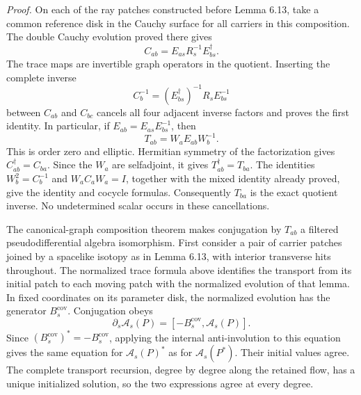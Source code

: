\documentclass[
  english,
  11pt,
  reqno]{amsart}
\begin{document}
\emph{Proof.} On each of the ray patches constructed before Lemma 6.13,
take a common reference disk in the Cauchy surface for all carriers in
this composition. The double Cauchy evolution proved there gives%
 \[
C_{ab}=E_{as}R_s^{-1}E_{bs}^\dagger.
\] The trace maps are invertible graph operators in the quotient.
Inserting the complete inverse \[
C_b^{-1}=(E_{bs}^\dagger)^{-1}R_sE_{bs}^{-1}
\] between \(C_{ab}\) and \(C_{bc}\) cancels all four adjacent inverse
factors and proves the first identity. In particular, if
\(E_{ab}=E_{as}E_{bs}^{-1}\), then%
 \[
T_{ab}=W_aE_{ab}W_b^{-1}.
\] This is order zero and elliptic. Hermitian symmetry of the
factorization gives \(C_{ab}^\dagger=C_{ba}\). Since the \(W_a\) are
selfadjoint, it gives \(T_{ab}^\dagger=T_{ba}\). The identities
\(W_b^2=C_b^{-1}\) and \(W_aC_aW_a=I\), together with the mixed identity
already proved, give the identity and cocycle formulas. Consequently
\(T_{ba}\) is the exact quotient inverse. No undetermined scalar occurs
in these cancellations.

The canonical-graph composition theorem makes conjugation by \(T_{ab}\)
a filtered pseudodifferential algebra isomorphism. First consider a pair
of carrier patches joined by a spacelike isotopy as in Lemma 6.13, with
interior transverse hits throughout. The normalized trace formula above
identifies the transport from its initial patch to each moving patch
with the normalized evolution of that lemma. In fixed coordinates on its
parameter disk, the normalized evolution has the generator
\(B_s^{\mathrm{cov}}\). Conjugation obeys \[
\partial_s\mathcal A_s(P)
=[-B_s^{\mathrm{cov}},\mathcal A_s(P)].
\] Since \((B_s^{\mathrm{cov}})^*=-B_s^{\mathrm{cov}}\), applying the
internal anti-involution to this equation gives the same equation for
\(\mathcal A_s(P)^*\) as for \(\mathcal A_s(P^*)\). Their initial values
agree. The complete transport recursion, degree by degree along the
retained flow, has a unique initialized solution, so the two expressions
agree at every degree.
\end{document}
